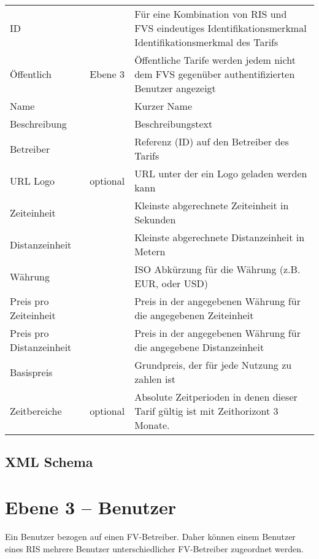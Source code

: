 \begin{flushleft}
\begin{tabularx}{\linewidth}{l>{\raggedright\arraybackslash}l>{\raggedright\arraybackslash}X} 
\toprule
ID & & Für eine Kombination von RIS und FVS eindeutiges Identifikationsmerkmal Identifikationsmerkmal des Tarifs \\
Öffentlich & Ebene 3 & Öffentliche Tarife werden jedem nicht dem FVS gegenüber authentifizierten Benutzer angezeigt \\
Name & & Kurzer Name \\
Beschreibung & & Beschreibungstext \\
Betreiber & & Referenz (ID) auf den Betreiber des Tarifs \\
URL Logo & optional & URL unter der ein Logo geladen werden kann \\
Zeiteinheit & & Kleinste abgerechnete Zeiteinheit in Sekunden \\
Distanzeinheit & & Kleinste abgerechnete Distanzeinheit in Metern \\
Währung & & ISO Abkürzung für die Währung (z.B. EUR, oder USD) \\
Preis pro Zeiteinheit & & Preis in der angegebenen Währung für die angegebenen Zeiteinheit \\
Preis pro Distanzeinheit & & Preis in der angegebenen Währung für die angegebene Distanzeinheit \\
Basispreis & & Grundpreis, der für jede Nutzung zu zahlen ist \\
Zeitbereiche & optional & Absolute Zeitperioden in denen dieser Tarif gültig ist mit Zeithorizont 3 Monate. \\
\bottomrule
\end{tabularx}
\end{flushleft}

\subsection{XML Schema}



\section{Ebene 3 -- Benutzer}
Ein Benutzer bezogen auf einen FV-Betreiber. Daher können einem Benutzer eines RIS mehrere Benutzer unterschiedlicher FV-Betreiber zugeordnet werden.


